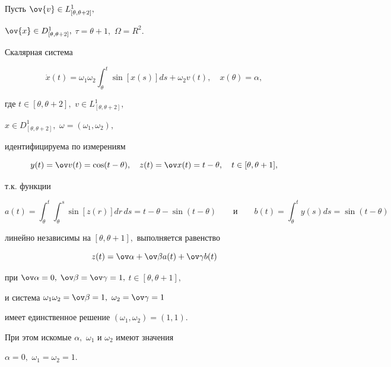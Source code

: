 \begin{exam} Пусть $\ov{v}\in L^1_{[\theta,\theta+2]},$


$\ov{x}\in D^1_{[\theta,\theta+2]},$ $\tau=\theta+1,$ $\Omega= R^2.$


Скалярная система


$$


\Dot{x}(t) = \omega_1\omega_2\int_{\theta}^t \sin[x(s)]ds +


\omega_2 v(t),\quad


x(\theta)=\alpha,


$$


где $t\in[\theta,\theta+2],$ $v\in L^1_{[\theta,\theta+2]},$


$x\in D^1_{[\theta,\theta+2]},$ $\omega=(\omega_1,\omega_2),$


идентифицируема по измерениям


$$


y(t) = \ov v(t) = \cos(t-\theta),\quad


z(t) = \ov x(t) = t-\theta,\quad


t\in[\theta,\theta+1],


$$


т.к. функции


$$


a(t) = \int_{\theta}^t\int_{\theta}^s \sin[z(r)]dr\,ds = t - \theta-


\sin(t-\theta)\qquad\text{и}\qquad b(t) = \int_{\theta}^t y(s)ds =


\sin(t-\theta)


$$


линейно независимы на $[\theta,\theta+1],$ выполняется равенство


$$


z(t) = \ov\alpha + \ov\beta a(t) + \ov\gamma b(t)


$$


при $\ov\alpha=0,$ $\ov\beta=\ov\gamma=1,$ $t\in[\theta,\theta+1],$


и система $\omega_1\omega_2= \ov\beta= 1,$ $\omega_2=\ov\gamma= 1$


имеет единственное решение $(\omega_1,\omega_2) = (1,1).$


При этом искомые $\alpha,$ $\omega_1$ и $\omega_2$ имеют значения


$\alpha=0,$ $\omega_1= \omega_2= 1.$


\end{exam}






